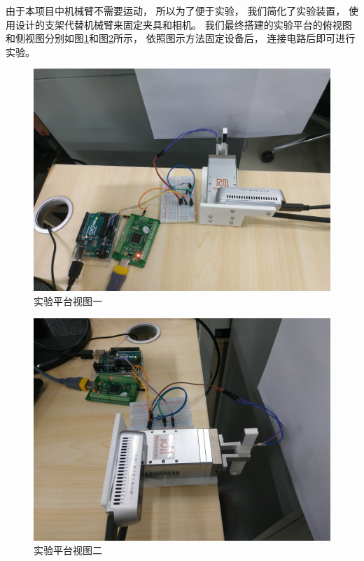 由于本项目中机械臂不需要运动， 所以为了便于实验， 我们简化了实验装置，
使用设计的支架代替机械臂来固定夹具和相机。
我们最终搭建的实验平台的俯视图和侧视图分别如图\ref{fig:exp-1}和图\ref{fig:exp-2}所示，
依照图示方法固定设备后， 连接电路后即可进行实验。

\begin{figure}[!ht]
  \centering
  \includegraphics[width=11.3cm]{chapter04/pic/exp-1}
  \caption{\label{fig:exp-1}
    实验平台视图一}
  \vspace{-0.3cm}
\end{figure}

\begin{figure}[!ht]
  \centering
  \includegraphics[width=11.3cm]{chapter04/pic/exp-2}
  \caption{\label{fig:exp-2}
    实验平台视图二}
  \vspace{-0.3cm}
\end{figure}


